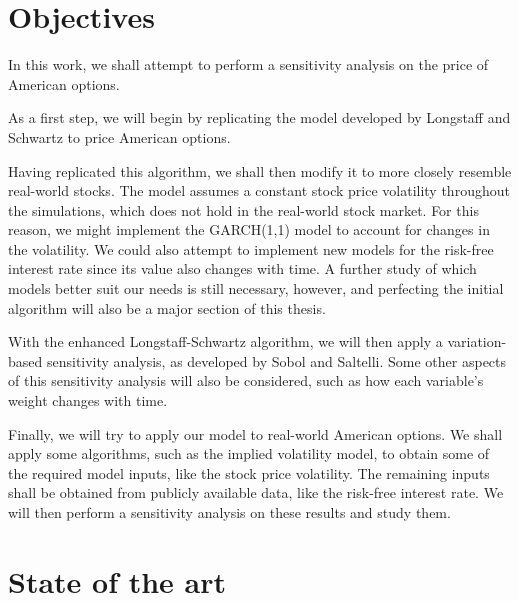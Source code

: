 \documentclass[a4paper,twocolumn,aps,prd,longbibliography,superscriptaddress]{revtex4-1}
\begin{document}
\section{Objectives}
In this work, we shall attempt to perform a sensitivity analysis on the price of American options.

As a first step, we will begin by replicating the model developed by Longstaff and Schwartz to price American options.

Having replicated this algorithm, we shall then modify it to more closely resemble real-world stocks.
The model assumes a constant stock price volatility throughout the simulations, which does not hold in the real-world stock market. For this reason, we might implement the GARCH(1,1) model to account for changes in the volatility.
We could also attempt to implement new models for the risk-free interest rate since its value also changes with time.
A further study of which models better suit our needs is still necessary, however, and perfecting the initial algorithm will also be a major section of this thesis.

With the enhanced Longstaff-Schwartz algorithm, we will then apply a variation-based sensitivity analysis, as developed by Sobol and Saltelli.
Some other aspects of this sensitivity analysis will also be considered, such as how each variable's weight changes with time.

Finally, we will try to apply our model to real-world American options.
We shall apply some algorithms, such as the implied volatility model, to obtain some of the required model inputs, like the stock price volatility. The remaining inputs shall be obtained from publicly available data, like the risk-free interest rate.
We will then perform a sensitivity analysis on these results and study them.

\section{State of the art}
\end{document}
